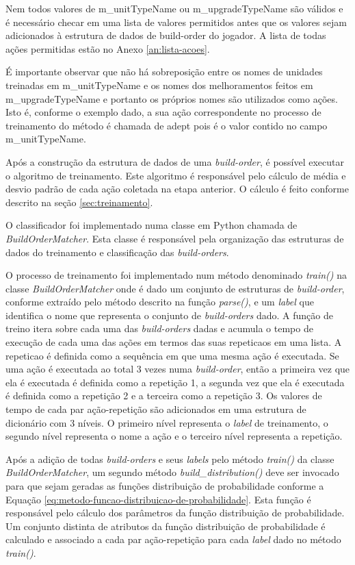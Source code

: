 Nem todos valores de m\_unitTypeName ou m\_upgradeTypeName são válidos e é necessário checar em uma lista de valores permitidos antes que os valores sejam adicionados à estrutura de dados de \gls{build-order} do jogador. A lista de todas ações permitidas estão no Anexo \ref{an:lista-acoes}.

É importante observar que não há sobreposição entre os nomes de \glspl{unidade} treinadas em m\_unitTypeName e os nomes dos \glspl{melhoramento} feitos em m\_upgradeTypeName e portanto os próprios nomes são utilizados como ações. Isto é, conforme o exemplo dado, a sua ação correspondente no processo de treinamento do método é chamada de \gls{adept} pois é o valor contido no campo m\_unitTypeName.

Após a construção da estrutura de dados de uma \textit{\gls{build-order}}, é possível executar o algoritmo de treinamento. Este algoritmo é responsável pelo cálculo de média e desvio padrão de cada ação coletada na etapa anterior. O cálculo é feito conforme descrito na seção \ref{sec:treinamento}.

O classificador foi implementado numa classe em Python chamada de \textit{BuildOrderMatcher}. Esta classe é responsável pela organização das estruturas de dados do treinamento e classificação das \textit{\glspl{build-order}}.

O processo de treinamento foi implementado num método denominado \textit{train()} na classe \textit{BuildOrderMatcher} onde é dado um conjunto de estruturas de \textit{\gls{build-order}}, conforme extraído pelo método descrito na função \textit{parse()}, e um \textit{label} que identifica o nome que representa o conjunto de \textit{\glspl{build-order}} dado. A função de treino itera sobre cada uma das \textit{\glspl{build-order}} dadas e acumula o tempo de execução de cada uma das ações em termos das suas \glspl{repeticao} em uma lista. A \gls{repeticao} é definida como a sequência em que uma mesma ação é executada. Se uma ação é executada ao total 3 vezes numa \textit{\gls{build-order}}, então a primeira vez que ela é executada é definida como a repetição 1, a segunda vez que ela é executada é definida como a repetição 2 e a terceira como a repetição 3. Os valores de tempo de cada par ação-repetição são adicionados em uma estrutura de dicionário com 3 níveis. O primeiro nível representa o \textit{label} de treinamento, o segundo nível representa o nome a ação e o terceiro nível representa a repetição.

Após a adição de todas \textit{\glspl{build-order}} e seus \textit{labels} pelo método \textit{train()} da classe \textit{BuildOrderMatcher}, um segundo método \textit{build\_distribution()} deve ser invocado para que sejam geradas as funções distribuição de probabilidade conforme a Equação \ref{eq:metodo-funcao-distribuicao-de-probabilidade}. Esta função é responsável pelo cálculo dos parâmetros da função distribuição de probabilidade. Um conjunto distinta de atributos da função distribuição de probabilidade é calculado e associado a cada par ação-repetição para cada \textit{label} dado no método \textit{train()}.

